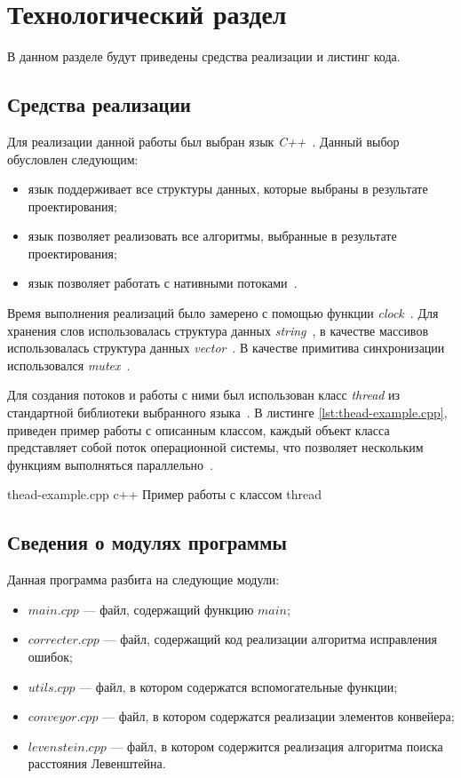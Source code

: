 \chapter{Технологический раздел}

В данном разделе будут приведены  средства реализации и листинг кода.


\section{Средства реализации}

Для реализации данной работы был выбран язык \textit{C++}~\cite{cpp}.
Данный выбор обусловлен следующим:
\begin{itemize}
	\item язык поддерживает все структуры данных, которые выбраны в результате проектирования;
	\item язык позволяет реализовать все алгоритмы, выбранные в результате проектирования;
	\item язык позволяет работать с нативными потоками~\cite{thread}. 
\end{itemize}

Время выполнения реализаций было замерено с помощью функции \textit{clock}~\cite{clock}. 
Для хранения слов использовалась структура данных \textit{string}~\cite{wstring}, в качестве массивов использовалась структура данных \textit{vector}~\cite{vector}.
В качестве примитива синхронизации использовался \textit{mutex}~\cite{mutex}.

Для создания потоков и работы с ними был использован класс \textit{thread} из стандартной библиотеки выбранного языка~\cite{thread}.
В листинге \ref{lst:thead-example.cpp}, приведен пример работы с описанным классом, каждый объект класса представляет собой поток операционной системы, что позволяет нескольким функциям выполняться параллельно~\cite{thread}. 

\clearpage
{}
{thead-example.cpp} %
{c++} %
{Пример работы с классом thread} %



\section{Сведения о модулях программы}

Данная программа разбита на следующие модули:
\begin{itemize}
	\item $main.cpp$ --- файл, содержащий функцию $main$;
	\item $correcter.cpp$ --- файл, содержащий код реализации алгоритма исправления ошибок;
	\item $utils.cpp$ --- файл, в котором содержатся вспомогательные функции;
	\item $conveyor.cpp$ --- файл, в котором содержатся реализации элементов конвейера;
	\item $levenstein.cpp$ --- файл, в котором содержится реализация алгоритма поиска расстояния Левенштейна.
\end{itemize}

